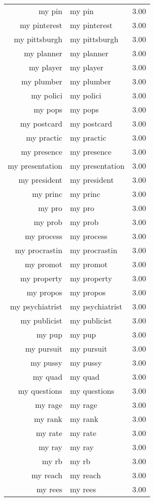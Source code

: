 \begin{table}[ht]
\begin{tabular}{rlr}
  my pin & my pin & 3.00 \\ 
  my pinterest & my pinterest & 3.00 \\ 
  my pittsburgh & my pittsburgh & 3.00 \\ 
  my planner & my planner & 3.00 \\ 
  my player & my player & 3.00 \\ 
  my plumber & my plumber & 3.00 \\ 
  my polici & my polici & 3.00 \\ 
  my pops & my pops & 3.00 \\ 
  my postcard & my postcard & 3.00 \\ 
  my practic & my practic & 3.00 \\ 
  my presence & my presence & 3.00 \\ 
  my presentation & my presentation & 3.00 \\ 
  my president & my president & 3.00 \\ 
  my princ & my princ & 3.00 \\ 
  my pro & my pro & 3.00 \\ 
  my prob & my prob & 3.00 \\ 
  my process & my process & 3.00 \\ 
  my procrastin & my procrastin & 3.00 \\ 
  my promot & my promot & 3.00 \\ 
  my property & my property & 3.00 \\ 
  my propos & my propos & 3.00 \\ 
  my psychiatrist & my psychiatrist & 3.00 \\ 
  my publicist & my publicist & 3.00 \\ 
  my pup & my pup & 3.00 \\ 
  my pursuit & my pursuit & 3.00 \\ 
  my pussy & my pussy & 3.00 \\ 
  my quad & my quad & 3.00 \\ 
  my questions & my questions & 3.00 \\ 
  my rage & my rage & 3.00 \\ 
  my rank & my rank & 3.00 \\ 
  my rate & my rate & 3.00 \\ 
  my ray & my ray & 3.00 \\ 
  my rb & my rb & 3.00 \\ 
  my reach & my reach & 3.00 \\ 
  my rees & my rees & 3.00 \\ 

\end{tabular}
\end{table}

